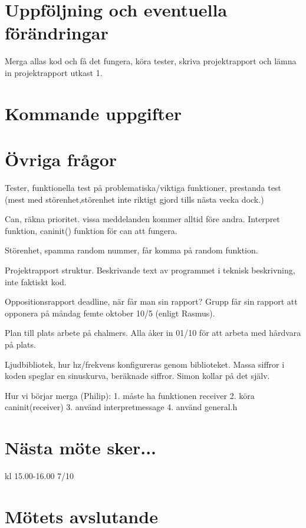 \documentclass{article}
\begin{document}
\section{Uppföljning och eventuella förändringar} 

Merga allas kod och få det fungera, köra tester, skriva projektrapport och lämna in projektrapport utkast 1.

\section{Kommande uppgifter} 

\section{Övriga frågor} 

Tester, funktionella test på problematiska/viktiga funktioner, prestanda test (mest med störenhet,störenhet inte riktigt gjord tills nästa vecka dock.)

Can, räkna prioritet. vissa meddelanden kommer alltid före andra. Interpret funktion, can\textunderscore init() funktion för can att fungera. 

Störenhet, spamma random nummer, får komma på random funktion. 

Projektrapport struktur. Beskrivande text av programmet i teknisk beskrivning, inte faktiskt kod. 

Oppositionsrapport deadline, när får man sin rapport? Grupp får sin rapport att opponera på måndag femte oktober 10/5 (enligt Rasmus).

Plan till plats arbete på chalmers. Alla åker in 01/10 för att arbeta med hårdvara på plats.

Ljudbibliotek, hur hz/frekvens konfigureras genom biblioteket. Massa siffror i koden speglar en sinuskurva, beräknade siffror. Simon kollar på det själv.

Hur vi börjar merga (Philip): 1. måste ha funktionen receiver 2. köra can\textunderscore init(receiver) 3. använd interpret\textunderscore message 4. använd general.h

\section{Nästa möte sker...} 

kl 15.00-16.00 7/10

\section{Mötets avslutande} 
\end{document}
